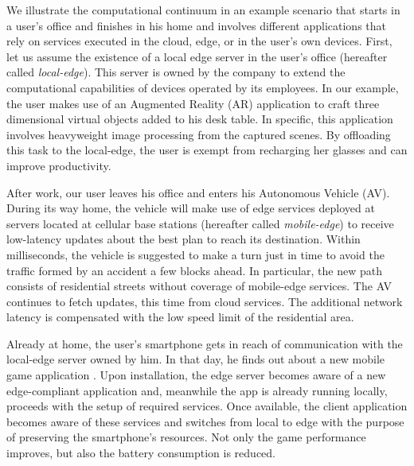 We illustrate the computational continuum in an example scenario  that starts in a user's office and finishes in his home and involves different applications that rely on services executed in the cloud, edge, or in the user's own devices. 
First, let us assume the existence of a local edge server in the user's office (hereafter called \textit{local-edge}). This server is owned by the company to extend the computational capabilities of devices operated by its employees. In our example, the user makes use of an %
Augmented Reality (AR) application to craft three dimensional virtual objects added to his desk table. In specific, this application involves heavyweight image processing from the captured scenes. By offloading this task to the local-edge, the user is exempt from recharging her glasses and can improve productivity. 

After work, our user leaves his office and enters his Autonomous Vehicle (AV). During its way home, the vehicle will make use of edge services deployed at servers located at cellular base stations (hereafter called \textit{mobile-edge}) to receive low-latency updates about the best plan to reach its destination. Within milliseconds, the vehicle is suggested to make a turn just in time to avoid the traffic formed by an accident a few blocks ahead. In particular, the new path consists of residential streets without coverage of mobile-edge services. The AV continues to fetch updates, this time from cloud services. The additional network latency is compensated with the low speed limit of the residential area.

Already at home, the user's smartphone gets in reach of communication with the local-edge server owned by him. In that day, he finds out about a new mobile game application 
. Upon installation, the edge server becomes aware of a new edge-compliant application and, meanwhile the app is already running locally, proceeds with the setup of required services. Once available, the client application becomes aware of these services and switches from local to edge with the purpose of preserving the smartphone's resources. Not only the game performance improves, but also the battery consumption is reduced.  

